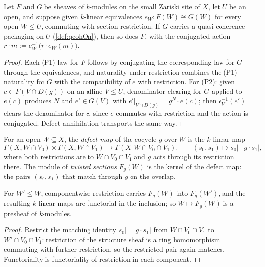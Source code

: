 \begin{definition}
  \label{def:qcohOn_transport}
  \leanok
  Let \(F\) and \(G\) be sheaves of \(k\)-modules on the small Zariski site of \(X\), let
  \(U\) be an open, and suppose given \(k\)-linear equivalences
  \(e_W : F(W) \cong G(W)\) for every open \(W \le U\), commuting with section
  restriction. If \(G\) carries a quasi-coherence packaging on \(U\)
  (\ref{def:qcohOn}), then so does \(F\), with the conjugated action
  \(r \cdot m := e_W^{-1}\bigl(r \cdot e_W(m)\bigr)\).
\end{definition}
\begin{proof}
  \leanok
  Each (P1) law for \(F\) follows by conjugating the corresponding law for \(G\) through
  the equivalences, and naturality under restriction combines the (P1) naturality for
  \(G\) with the compatibility of \(e\) with restriction. For (P2): given
  \(c \in F(V \cap D(g))\) on an affine \(V \le U\), denominator clearing for \(G\)
  applied to \(e(c)\) produces \(N\) and \(e' \in G(V)\) with
  \(e'|_{V \cap D(g)} = g^N \cdot e(c)\); then \(e_V^{-1}(e')\) clears the denominator
  for \(c\), since \(e\) commutes with restriction and the action is conjugated. Defect
  annihilation transports the same way.
\end{proof}

\begin{definition}
  \label{def:twistSections}
  \leanok
  For an open \(W \subseteq X\), the \emph{defect map} of the cocycle \(g\) over \(W\) is
  the \(k\)-linear map
  \[
    \Gamma(X, W \cap V_0) \times \Gamma(X, W \cap V_1) \longrightarrow
      \Gamma(X, W \cap V_0 \cap V_1), \qquad
    (s_0, s_1) \longmapsto s_0| - g \cdot s_1|,
  \]
  where both restrictions are to \(W \cap V_0 \cap V_1\) and \(g\) acts through its
  restriction there. The module of \emph{twisted sections} \(F_g(W)\) is the kernel of
  the defect map: the pairs \((s_0, s_1)\) that match through \(g\) on the overlap.
\end{definition}

\begin{lemma}
  \label{lem:twistSections_presheaf}
  \leanok
  For \(W' \le W\), componentwise restriction carries \(F_g(W)\) into \(F_g(W')\), and
  the resulting \(k\)-linear maps are functorial in the inclusion; so \(W \mapsto F_g(W)\)
  is a presheaf of \(k\)-modules.
\end{lemma}
\begin{proof}
  \leanok
  Restrict the matching identity \(s_0| = g \cdot s_1|\) from \(W \cap V_0 \cap V_1\) to
  \(W' \cap V_0 \cap V_1\): restriction of the structure sheaf is a ring homomorphism
  commuting with further restriction, so the restricted pair again matches.
  Functoriality is functoriality of restriction in each component.
\end{proof}

